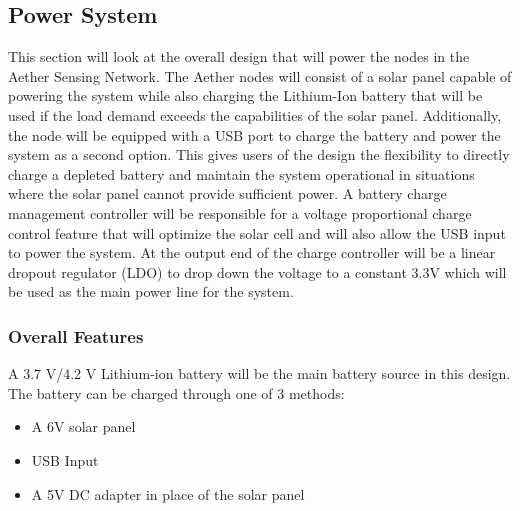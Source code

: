 \subsection{Power System} \label{sec:power}
This section will look at the overall design that will power the nodes in the Aether Sensing Network. The Aether nodes will consist of a solar panel capable of powering the system while also charging the Lithium-Ion battery that will be used if the load demand exceeds the capabilities of the solar panel. Additionally, the node will be equipped with a USB port to charge the battery and power the system as a second option. This gives users of the design the flexibility to directly charge a depleted battery and maintain the system operational in situations where the solar panel cannot provide sufficient power. A battery charge management controller will be responsible for a voltage proportional charge control feature that will optimize the solar cell and will also allow the USB input to power the system. At the output end of the charge controller will be a linear dropout regulator (LDO) to drop down the voltage to a constant 3.3V which will be used as the main power line for the system.

\subsubsection{Overall Features}
A 3.7 V/4.2 V Lithium-ion battery will be the main battery source in this design. The battery can be charged through one of 3 methods:
\begin{itemize}
    \item A 6V solar panel
    \item USB Input
    \item A 5V DC adapter in place of the solar panel
\end{itemize}

